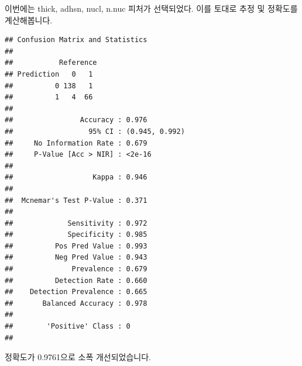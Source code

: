\documentclass[12pt,]{book}
\newenvironment{Shaded}{\begin{snugshade}}{\end{snugshade}}
\newcommand{\DataTypeTok}[1]{\textcolor[rgb]{0.13,0.29,0.53}{#1}}
\newcommand{\DecValTok}[1]{\textcolor[rgb]{0.00,0.00,0.81}{#1}}
\newcommand{\FloatTok}[1]{\textcolor[rgb]{0.00,0.00,0.81}{#1}}
\newcommand{\KeywordTok}[1]{\textcolor[rgb]{0.13,0.29,0.53}{\textbf{#1}}}
\newcommand{\NormalTok}[1]{#1}
\newcommand{\OperatorTok}[1]{\textcolor[rgb]{0.81,0.36,0.00}{\textbf{#1}}}
\newcommand{\StringTok}[1]{\textcolor[rgb]{0.31,0.60,0.02}{#1}}
\begin{document}
이번에는 thick, adhsn, nucl, n.nuc 피처가 선택되었다. 이를 토대로 추정 및 정확도를 계산해봅니다.

\begin{Shaded}
\end{Shaded}

\begin{verbatim}
## Confusion Matrix and Statistics
## 
##           Reference
## Prediction   0   1
##          0 138   1
##          1   4  66
##                                         
##                Accuracy : 0.976         
##                  95% CI : (0.945, 0.992)
##     No Information Rate : 0.679         
##     P-Value [Acc > NIR] : <2e-16        
##                                         
##                   Kappa : 0.946         
##                                         
##  Mcnemar's Test P-Value : 0.371         
##                                         
##             Sensitivity : 0.972         
##             Specificity : 0.985         
##          Pos Pred Value : 0.993         
##          Neg Pred Value : 0.943         
##              Prevalence : 0.679         
##          Detection Rate : 0.660         
##    Detection Prevalence : 0.665         
##       Balanced Accuracy : 0.978         
##                                         
##        'Positive' Class : 0             
## 
\end{verbatim}

정확도가 0.9761으로 소폭 개선되었습니다.
\end{document}
